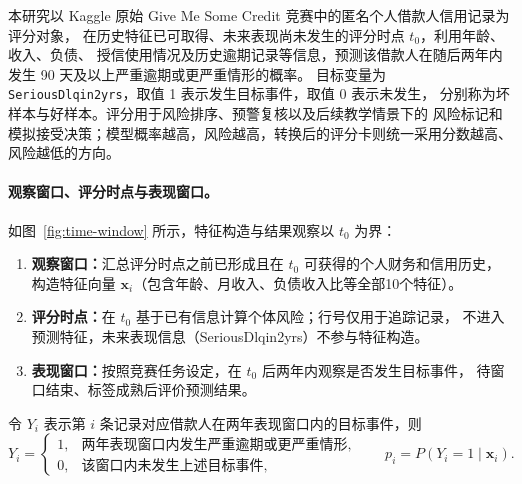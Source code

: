 
本研究以 Kaggle 原始 Give Me Some Credit 竞赛中的匿名个人借款人信用记录为评分对象，
在历史特征已可取得、未来表现尚未发生的评分时点 $t_0$，利用年龄、收入、负债、
授信使用情况及历史逾期记录等信息，预测该借款人在随后两年内发生
90 天及以上严重逾期或更严重情形的概率。
目标变量为 \texttt{SeriousDlqin2yrs}，取值 1 表示发生目标事件，取值 0 表示未发生，
分别称为坏样本与好样本。评分用于风险排序、预警复核以及后续教学情景下的
风险标记和模拟接受决策；模型概率越高，风险越高，转换后的评分卡则统一采用分数越高、风险越低的方向。

\paragraph{观察窗口、评分时点与表现窗口。}
如图~\ref{fig:time-window} 所示，特征构造与结果观察以 $t_0$ 为界：
\begin{enumerate}
  \setlength{\itemsep}{0.15em}
  \setlength{\parskip}{0pt}
  \item \textbf{观察窗口：}汇总评分时点之前已形成且在 $t_0$ 可获得的个人财务和信用历史，
  构造特征向量 $\boldsymbol{x}_i$（包含年龄、月收入、负债收入比等全部10个特征）。
  \item \textbf{评分时点：}在 $t_0$ 基于已有信息计算个体风险；行号仅用于追踪记录，
  不进入预测特征，未来表现信息（SeriousDlqin2yrs）不参与特征构造。
  \item \textbf{表现窗口：}按照竞赛任务设定，在 $t_0$ 后两年内观察是否发生目标事件，
  待窗口结束、标签成熟后评价预测结果。
\end{enumerate}

令 $Y_i$ 表示第 $i$ 条记录对应借款人在两年表现窗口内的目标事件，则
\begin{equation}
  Y_i=
  \begin{cases}
    1, & \text{两年表现窗口内发生严重逾期或更严重情形},\\
    0, & \text{该窗口内未发生上述目标事件},
  \end{cases}
  \qquad
  p_i=P\!\left(Y_i=1\mid\boldsymbol{x}_i\right).
  \label{eq:prediction-target}
\end{equation}

